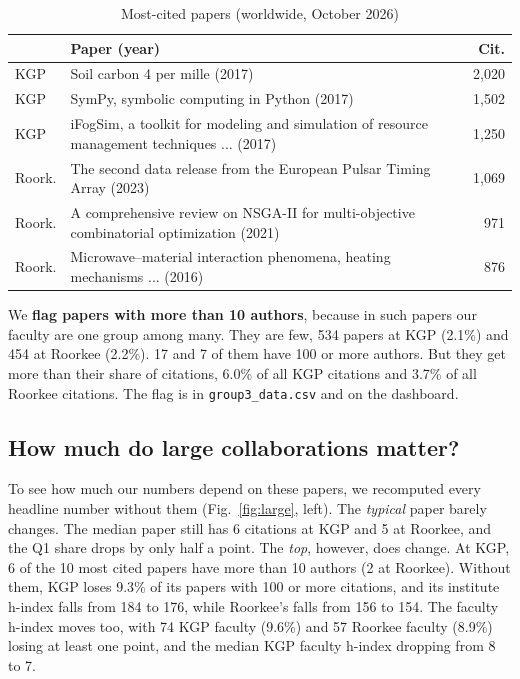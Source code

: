\documentclass[conference,10pt]{IEEEtran}
\begin{document}
\begin{table}[!t]
\centering
\caption{Most-cited papers (worldwide, October 2026)}
\label{tab:cited}
\footnotesize
\begin{tabular}{@{}l>{\raggedright\arraybackslash}p{5.0cm}r@{}}
\toprule
 & \textbf{Paper (year)} & \textbf{Cit.} \\
\midrule
KGP & Soil carbon 4 per mille (2017) & 2,020 \\
KGP & SymPy, symbolic computing in Python (2017) & 1,502 \\
KGP & iFogSim, a toolkit for modeling and simulation of resource management techniques ... (2017) & 1,250 \\
\midrule
Roork. & The second data release from the European Pulsar Timing Array (2023) & 1,069 \\
Roork. & A comprehensive review on NSGA-II for multi-objective combinatorial optimization (2021) & 971 \\
Roork. & Microwave--material interaction phenomena, heating mechanisms ... (2016) & 876 \\
\bottomrule
\end{tabular}
\end{table}

We \textbf{flag papers with more than 10 authors}, because in such papers our faculty are one group among many. They are few, 534 papers at KGP (2.1\%) and 454 at Roorkee (2.2\%). 17 and 7 of them have 100 or more authors. But they get more than their share of citations, 6.0\% of all KGP citations and 3.7\% of all Roorkee citations. The flag is in \texttt{group3\_data.csv} and on the dashboard.

\subsection{How much do large collaborations matter?}
To see how much our numbers depend on these papers, we recomputed every headline number without them
(Fig.~\ref{fig:large}, left). The \textit{typical} paper barely changes. The median paper still has 6 citations at KGP
and 5 at Roorkee, and the Q1 share drops by only half a point. The \textit{top}, however, does change. At KGP, 6 of the
10 most cited papers have more than 10 authors (2 at Roorkee). Without them, KGP loses 9.3\% of its papers with 100 or
more citations, and its institute h-index falls from 184 to 176, while Roorkee's falls from 156 to 154. The faculty
h-index moves too, with 74 KGP faculty (9.6\%) and 57 Roorkee faculty (8.9\%) losing at least one point, and the median
KGP faculty h-index dropping from 8 to 7.
\end{document}
